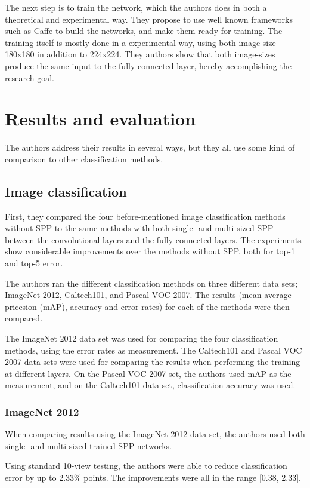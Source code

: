 The next step is to train the network, which the authors does in both a theoretical and experimental way. They propose to use well known frameworks such as Caffe \cite{IMGNET} to build the networks, and make them ready for training. The training itself is mostly done in a experimental way, using both image size 180x180 in addition to 224x224. They authors show that both image-sizes produce the same input to the fully connected layer, hereby accomplishing the research goal. 

 
\section{Results and evaluation}
The authors address their results in several ways, but they all use some kind of comparison to other classification methods.

\subsection{Image classification}
First, they compared the four before-mentioned image classification methods without SPP to the same methods with both single- and multi-sized SPP between the convolutional layers and the fully connected layers. The experiments show considerable improvements over the methods without SPP, both for top-1 and top-5 error.

The authors ran the different classification methods on three different data sets; ImageNet 2012, Caltech101, and Pascal VOC 2007. The results (mean average pricesion (mAP), accuracy and error rates) for each of the methods were then compared.

The ImageNet 2012 data set was used for comparing the four classification methods, using the error rates as measurement. The Caltech101 and Pascal VOC 2007 data sets were used for comparing the results when performing the training at different layers. On the Pascal VOC 2007 set, the authors used mAP as the measurement, and on the Caltech101 data set, classification accuracy was used.

\subsubsection{ImageNet 2012}
When comparing results using the ImageNet 2012 data set, the authors used both single- and multi-sized trained SPP networks.

Using standard 10-view testing, the authors were able to reduce classification error by up to 2.33\% points. The improvements were all in the range [0.38, 2.33].

